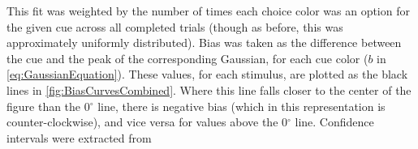 This fit was weighted by the number of times each choice color was an option for the given cue across all completed trials (though as before, this was approximately uniformly distributed). 
Bias was taken as the difference between the cue and the peak of the corresponding Gaussian, for each cue color ($b$ in \autoref{eq:GaussianEquation}). 
These values, for each stimulus, are plotted as the black lines in \autoref{fig:BiasCurvesCombined}.
Where this line falls closer to the center of the figure than the 0$^{\circ}$ line, there is negative bias (which in this representation is counter-clockwise), and vice versa for values above the 0$^{\circ}$ line.
Confidence intervals were extracted from 

%

